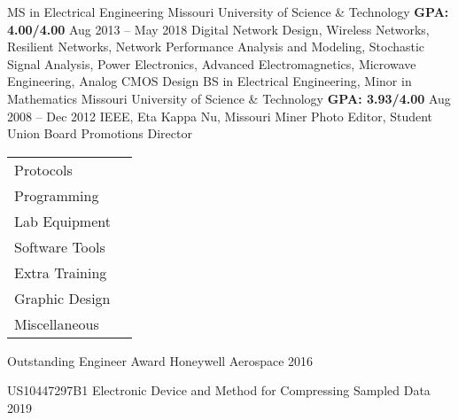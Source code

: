 \documentclass[]{awesome-cv}
\begin{document}
\newpage 
\vspace*{0mm}

\begin{cventries}
	\cventry
	{MS in Electrical Engineering}
	{Missouri University of Science \& Technology}
	{\bfseries GPA: 4.00/4.00}
	{Aug 2013 – May 2018}
	{Digital Network Design, Wireless Networks, Resilient Networks, Network Performance Analysis and Modeling, \newline Stochastic Signal Analysis, Power Electronics, Advanced Electromagnetics, Microwave Engineering, Analog CMOS Design}
	\cventry
	{BS in Electrical Engineering, Minor in Mathematics}
	{Missouri University of Science \& Technology}
	{\bfseries GPA: 3.93/4.00}
	{Aug 2008 – Dec 2012}
	{IEEE, Eta Kappa Nu, Missouri Miner Photo Editor, Student Union Board Promotions Director} %
\end{cventries}

\vspace*{0mm}

\begin{cventries}
	\cventry
	{\def\arraystretch{1.5}{\begin{tabular}{ l l}
		Protocols  & {\skill{ Ethernet, USB, WiFi, BT, I2C, SPI, HDMI, MIPI, GPS, UART, PCIe}} \\
		Programming  & {\skill{ Python, PowerShell, VB.NET, Java, MATLAB, Arduino, Git, Subversion, TestStand, ADB, VISA}} \\
		Lab Equipment  & {\skill{ Oscilloscopes, multimeters, network analyzers, logic analyzers, power supplies, Raspberry Pi, Arduino, PXI}} \\
		Software Tools  & {\skill{ Schematic capture, PCB layout, Mentor Graphics, CADSTAR, OrCad, SPICE, Solidworks}} \\
		Extra Training  & {\skill{ Advanced GNSS/GPS, Radar Systems Certificate, MIL-STD 1553, Six Sigma Green Belt}} \\
		Graphic Design  & {\skill{ Adobe Photoshop, Adobe Illustrator, \LaTeX, HTML, CSS, Bootstrap}} \\
		Miscellaneous  & {\skill{ MS Office, Android, Linux, Windows, Atlassian suite, Azure DevOps}} \\
		\end{tabular}}}
	{}
	{}
	{}
	{}
\end{cventries}
\vspace{-6mm}

\begin{cvhonors}
	\cvhonor
	{Outstanding Engineer Award}
	{Honeywell Aerospace }
	{}
	{2016}
\end{cvhonors}

\begin{cvhonors}
	\cvhonor
	{US10447297B1}
	{Electronic Device and Method for Compressing Sampled Data }
	{}
	{2019}
\end{cvhonors}
\end{document}
